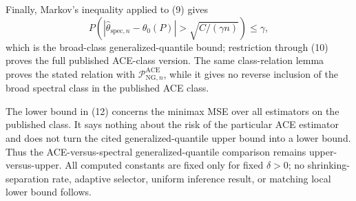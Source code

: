 Finally, Markov's inequality applied to (9) gives
\[
 P\!\left(
 |\widehat\theta_{\mathrm{spec},n}-\theta_0(P)|
 >\sqrt{C/(\gamma n)}
 \right)\le\gamma,
\]
which is the broad-class generalized-quantile bound; restriction through (10) proves the full published ACE-class version. The same class-relation lemma proves the stated relation with \(\mathcal P_{\mathrm{NG},n}^{\mathrm{ACE}}\), while it gives no reverse inclusion of the broad spectral class in the published ACE class.

The lower bound in (12) concerns the minimax MSE over all estimators on the published class. It says nothing about the risk of the particular ACE estimator and does not turn the cited generalized-quantile upper bound into a lower bound. Thus the ACE-versus-spectral generalized-quantile comparison remains upper-versus-upper. All computed constants are fixed only for fixed \(\delta>0\); no shrinking-separation rate, adaptive selector, uniform inference result, or matching local lower bound follows.